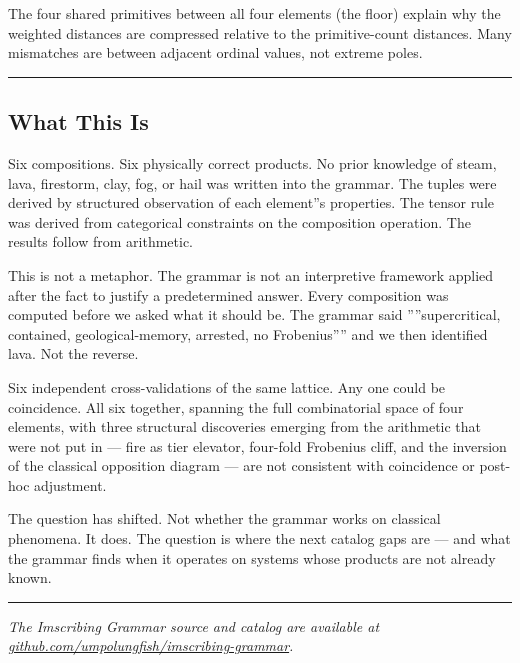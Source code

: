 \documentclass[12pt,a4paper]{article}
\begin{document}
The four shared primitives between all four elements (the floor) explain why the weighted distances are compressed relative to the primitive-count distances. Many mismatches are between adjacent ordinal values, not extreme poles.

\begin{center}
\rule{0.5\textwidth}{0.4pt}
\end{center}

\subsection{What This Is}

Six compositions. Six physically correct products. No prior knowledge of steam, lava, firestorm, clay, fog, or hail was written into the grammar. The tuples were derived by structured observation of each element''s properties. The tensor rule was derived from categorical constraints on the composition operation. The results follow from arithmetic.

This is not a metaphor. The grammar is not an interpretive framework applied after the fact to justify a predetermined answer. Every composition was computed before we asked what it should be. The grammar said ''''supercritical, contained, geological-memory, arrested, no Frobenius'''' and we then identified lava. Not the reverse.

Six independent cross-validations of the same lattice. Any one could be coincidence. All six together, spanning the full combinatorial space of four elements, with three structural discoveries emerging from the arithmetic that were not put in --- fire as tier elevator, four-fold Frobenius cliff, and the inversion of the classical opposition diagram --- are not consistent with coincidence or post-hoc adjustment.

The question has shifted. Not whether the grammar works on classical phenomena. It does. The question is where the next catalog gaps are --- and what the grammar finds when it operates on systems whose products are not already known.

\begin{center}
\rule{0.5\textwidth}{0.4pt}
\end{center}

\emph{The Imscribing Grammar source and catalog are available at \href{}{github.com/umpolungfish/imscribing-grammar}.}
\end{document}

